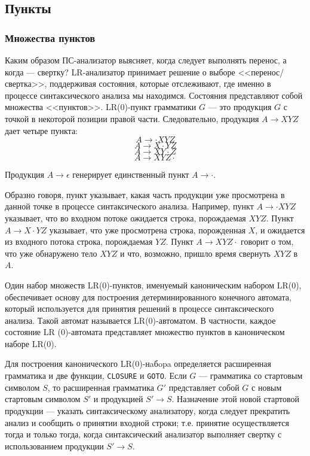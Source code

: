 \documentclass[bachelor, och, coursework, times]{SCWorks}
\begin{document}
\subsection{Пункты}
\subsubsection{Множества пунктов}
Каким образом ПС-анализатор выясняет, когда следует выполнять перенос, а когда --- свертку? LR-анализатор принимает решение о выборе <<перенос/свертка>>, поддерживая состояния, которые отслеживают, где именно в процессе синтаксического анализа мы находимся. Состояния представляют собой множества <<пунктов>>. LR(0)-пункт грамматики $G$ --- это продукция $G$ с точкой в некоторой позиции правой части. Следовательно, продукция $A \to XYZ$ дает четыре пункта: 
\[
	A \to \cdot XYZ 
\]
\[
	A \to X\cdot YZ 
\]
\[
	A \to XY\cdot Z 
\]
\[
	A \to XYZ\cdot
\]
 
Продукция $A \to \epsilon$ генерирует единственный пункт $A \to \cdot$. 

Образно говоря, пункт указывает, какая часть продукции уже просмотрена в данной точке в процессе синтаксического анализа. Например, пункт $A \to \cdot XYZ$ указывает, что во входном потоке ожидается строка, порождаемая $XYZ$. Пункт $A \to X\cdot YZ$ указывает, что уже просмотрена строка, порожденная $X$, и ожидается из входного потока строка, порождаемая $YZ$. Пункт $A \to XYZ\cdot$ говорит о том, что уже обнаружено тело $XYZ$ и что, возможно, пришло время свернуть $XYZ$ в $A$.~\cite{Compilers}

Один набор множеств LR(0)-пунктов, именуемый каноническим набором 
LR(0), обеспечивает основу для построения детерминированного конечного  
автомата, который используется для принятия решений в процессе синтаксического 
анализа. Такой автомат называется LR(0)-автоматом. В частности, каждое  
состояние LR (0)-автомата представляет множество пунктов в каноническом наборе 
LR(0). 

Для построения канонического LR(0)-нaбopa определяется расширенная грамматика и две функции, \verb|CLOSURE| и \verb|GOTO|. Если $G$ --- грамматика со стартовым символом $S$, то расширенная грамматика $G'$ представляет собой $G$ с новым стартовым символом $S'$ и продукцией $S' \to S$. Назначение этой новой стартовой продукции --- указать синтаксическому анализатору, когда следует прекратить анализ и сообщить о принятии входной строки; т.е. принятие осуществляется тогда и только тогда, когда синтаксический анализатор выполняет свертку с использованием продукции $S' \to S$.~\cite{Karpov}
\end{document}
